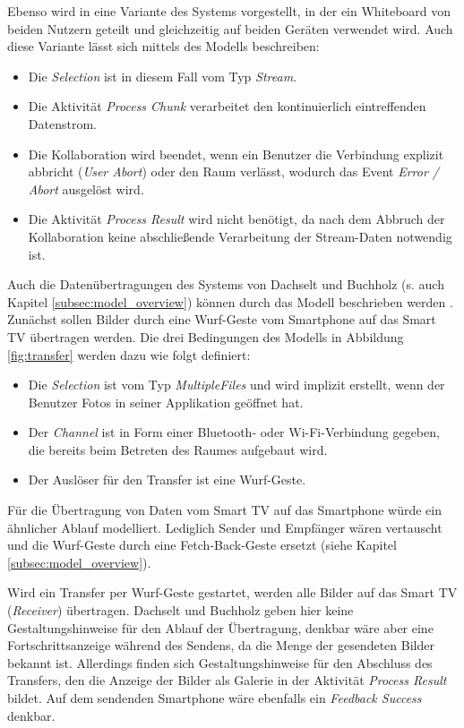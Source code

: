 Ebenso wird in \citep{Hinckley2003} eine Variante des Systems vorgestellt, in der ein Whiteboard von beiden Nutzern geteilt und gleichzeitig auf beiden Geräten verwendet wird. Auch diese Variante lässt sich mittels des Modells beschreiben:
\begin{itemize}
\item Die \textit{Selection} ist in diesem Fall vom Typ \textit{Stream}.
\item Die Aktivität \textit{Process Chunk} verarbeitet den kontinuierlich eintreffenden Datenstrom.
\item Die Kollaboration wird beendet, wenn ein Benutzer die Verbindung explizit abbricht (\textit{User Abort}) oder den Raum verlässt, wodurch das Event \textit{Error / Abort} ausgelöst wird.
\item Die Aktivität \textit{Process Result} wird nicht benötigt, da nach dem Abbruch der Kollaboration keine abschließende Verarbeitung der Stream-Daten notwendig ist.
\end{itemize}

Auch die Datenübertragungen des Systems von Dachselt und Buchholz (s. auch Kapitel \ref{subsec:model_overview}) können durch das Modell beschrieben werden \citep{Dachselt2009}. Zunächst sollen Bilder durch eine Wurf-Geste vom Smartphone auf das Smart TV übertragen werden. Die drei Bedingungen des Modells in Abbildung \ref{fig:transfer} werden dazu wie folgt definiert:
\begin{itemize}
\item Die \textit{Selection} ist vom Typ \textit{MultipleFiles} und wird implizit erstellt, wenn der Benutzer Fotos in seiner Applikation geöffnet hat.
\item Der \textit{Channel} ist in Form einer Bluetooth- oder Wi-Fi-Verbindung gegeben, die bereits beim Betreten des Raumes aufgebaut wird.
\item Der Auslöser für den Transfer ist eine Wurf-Geste.
\end{itemize}
Für die Übertragung von Daten vom Smart TV auf das Smartphone würde ein ähnlicher Ablauf modelliert. Lediglich Sender und Empfänger wären vertauscht und die Wurf-Geste durch eine Fetch-Back-Geste ersetzt (siehe Kapitel \ref{subsec:model_overview}).

Wird ein Transfer per Wurf-Geste gestartet, werden alle Bilder auf das Smart TV (\textit{Receiver}) übertragen. Dachselt und Buchholz geben hier keine Gestaltungshinweise für den Ablauf der Übertragung, denkbar wäre aber \zb eine Fortschrittsanzeige während des Sendens, da die Menge der gesendeten Bilder bekannt ist. Allerdings finden sich Gestaltungshinweise für den Abschluss des Transfers, den die Anzeige der Bilder als Galerie  in der Aktivität \textit{Process Result} bildet. Auf dem sendenden Smartphone wäre ebenfalls ein \textit{Feedback Success} denkbar.

